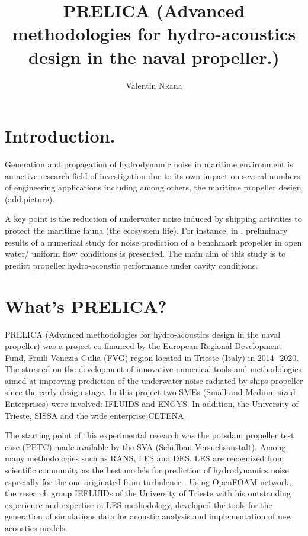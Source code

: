 \documentclass[10pt,a4paper,twoside]{article}
\author{Valentin Nkana}
\title{PRELICA (Advanced methodologies for hydro-acoustics design in the naval propeller.)}
\begin{document}
	
\maketitle
	
	
\section{Introduction.}

Generation and propagation of hydrodynamic noise in maritime environment is an active research field of investigation due to its own impact on several numbers of engineering applications including among others, the maritime propeller design (add.picture). 

A key point is the reduction of underwater noise induced by shipping activities to protect the maritime fauna (the ecosystem life). For instance, in \cite{sezen2020numerical}, preliminary results of a numerical study for noise prediction of a benchmark propeller in open water/ uniform flow conditions is presented. The main aim of this study is to predict propeller hydro-acoustic performance under cavity conditions.

\section{What's PRELICA?}

PRELICA (Advanced methodologies for hydro-acoustics design in the naval propeller) was a project co-financed by the European Regional Development Fund, Fruili Venezia Gulia (FVG) region located in Trieste (Italy) in 2014 -2020. The stressed on the development of innovative numerical tools and methodologies aimed at improving prediction of the underwater noise radiated by ships propeller since the early design stage. In this project two SMEs (Small and Medium-sized Enterprises) were involved: IFLUIDS and ENGYS. In addition, the University of Trieste, SISSA and the wide enterprise CETENA.


The starting point of this experimental research was the  potsdam propeller test case (PPTC) made available by the SVA (Schiffbau-Versuchsanstalt). Among many methodologies such as RANS, LES and DES. LES are recognized from scientific community as the best models for prediction of hydrodynamics noise especially for the one originated from  turbulence \cite{delafosse2008and}. Using OpenFOAM network, the research group IEFLUIDs of  the University of Trieste with his outstanding experience and expertise in LES methodology, developed the tools for the generation of simulations data for acoustic analysis and implementation of new acoustics models.  
\end{document}
